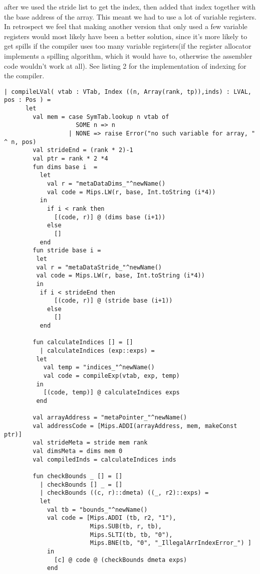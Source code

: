 after we used the stride list to get the index, then added that index together with the base address of the array. 
This meant we had to use a lot of variable registers. In retrospect we feel that making another version that only used a few variable 
registers would most likely have been a better solution, since it's more likely to get spills if the compiler uses too many variable registers(if the register allocator implements a spilling algorithm, 
which it would have to, otherwise the assembler code wouldn't work at all). 
See listing 2 for the implementation of indexing for the compiler.
\begin{lstlisting}[style=MLStyle, caption=Implementation of indexing for the compiler]
	| compileLVal( vtab : VTab, Index ((n, Array(rank, tp)),inds) : LVAL, pos : Pos ) =
      let 
        val mem = case SymTab.lookup n vtab of 
                    SOME n => n
                  | NONE => raise Error("no such variable for array, " ^ n, pos)
        val strideEnd = (rank * 2)-1
        val ptr = rank * 2 *4
        fun dims base i  = 
          let
            val r = "metaDataDims_"^newName()
            val code = Mips.LW(r, base, Int.toString (i*4))
          in
            if i < rank then
              [(code, r)] @ (dims base (i+1))
            else
              []
          end
        fun stride base i =
         let
         val r = "metaDataStride_"^newName() 
         val code = Mips.LW(r, base, Int.toString (i*4))
         in
          if i < strideEnd then
              [(code, r)] @ (stride base (i+1))
            else
              []
          end

        fun calculateIndices [] = []
          | calculateIndices (exp::exps) =
         let 
           val temp = "indices_"^newName()
           val code = compileExp(vtab, exp, temp)
         in
           [(code, temp)] @ calculateIndices exps
         end

        val arrayAddress = "metaPointer_"^newName()
        val addressCode = [Mips.ADDI(arrayAddress, mem, makeConst ptr)]
        val strideMeta = stride mem rank          
        val dimsMeta = dims mem 0 
        val compiledInds = calculateIndices inds

        fun checkBounds _ [] = []
          | checkBounds [] _ = []
          | checkBounds ((c, r)::dmeta) ((_, r2)::exps) =
          let
            val tb = "bounds_"^newName()
            val code = [Mips.ADDI (tb, r2, "1"), 
                        Mips.SUB(tb, r, tb), 
                        Mips.SLTI(tb, tb, "0"), 
                        Mips.BNE(tb, "0", "_IllegalArrIndexError_") ]
            in
              [c] @ code @ (checkBounds dmeta exps)
            end


\end{lstlisting}
